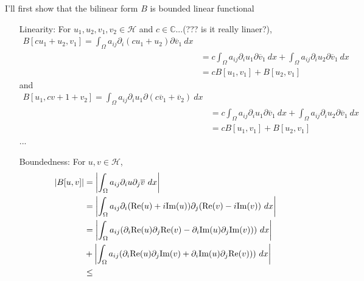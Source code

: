\documentclass{article}
\begin{document}
\begin{enumerate}
I'll first show that the bilinear form $B$ is bounded linear functional
\begin{enumerate}
\item[Linearity:] For $u_1,u_2,v_1,v_2\in \mathcal{H}$ and $c\in \mathbb{C}$...(??? is it really linaer?),
\begin{equation*}
\begin{split}
B[cu_1+u_2,v_1]=\int_\Omega a_{ij}\partial_i (cu_1+u_2)\partial \overline{v}_1~dx \\
&=c\int_\Omega a_{ij}\partial_i u_1\partial \overline{v}_1~dx+\int_\Omega a_{ij}\partial_i u_2\partial \overline{v}_1~dx \\
&=cB[u_1,v_1]+B[u_2,v_1]
\end{split}
\end{equation*}
and
\begin{equation*}
\begin{split}
B[u_1,cv+1+v_2]=\int_\Omega a_{ij}\partial_i u_1\partial (c\overline{v}_1+\overline{v}_2)~dx \\
&=c\int_\Omega a_{ij}\partial_i u_1\partial \overline{v}_1~dx+\int_\Omega a_{ij}\partial_i u_2\partial \overline{v}_1~dx \\
&=cB[u_1,v_1]+B[u_2,v_1]
\end{split}
\end{equation*}
...
\item[Boundedness:]  For $u,v\in \mathcal{H}$,
\begin{equation*}
\begin{split}
\abs{B[u,v]}&=\abs{\int_\Omega a_{ij}\partial_i u\partial_j \overline{v}~dx} \\
&=\abs{\int_\Omega a_{ij}\partial_i (\text{Re}(u)+i\text{Im}(u))\partial_j (\text{Re}(v)-i\text{Im}(v))~dx} \\
&=\abs{\int_\Omega a_{ij} (\partial_i\text{Re}(u)\partial_j\text{Re}(v)-\partial_i\text{Im}(u)\partial_j\text{Im}(v)))~dx}\\
&+\abs{\int_\Omega a_{ij} (\partial_i\text{Re}(u)\partial_j\text{Im}(v)+\partial_i\text{Im}(u)\partial_j\text{Re}(v)))~dx}\\
&\leq 
\end{split}
\end{equation*}
\end{enumerate}
\end{enumerate}
\end{document}
